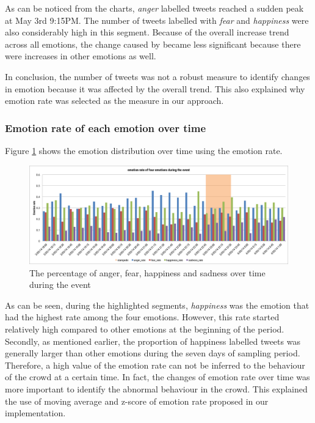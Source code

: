 As can be noticed from the charts, \textit{anger} labelled tweets reached a sudden peak at May 3rd 9:15PM. The number of tweets labelled with \textit{fear} and \textit{happiness} were also considerably high in this segment. Because of the overall increase trend across all emotions, the change caused by  became less significant because there were increases in other emotions as well.

In conclusion, the number of tweets was not a robust measure to identify changes in emotion because it was affected by the overall trend. This also explained why emotion rate was selected as the measure in our approach.

\subsubsection{Emotion rate of each emotion over time}
Figure \ref{fig:emotionRateEvent} shows the emotion distribution over time using the emotion rate. 

\begin{figure}[!htbp] 
\centering
\includegraphics[width=1.0\linewidth]{EmotionRateEvent}
\caption{The percentage of anger, fear, happiness and sadness over time during the event}
\label{fig:emotionRateEvent}
\end{figure}

As can be seen, during the highlighted segments, \textit{happiness} was the emotion that had the highest rate among the four emotions. However, this rate started relatively high compared to other emotions at the beginning of the period. Secondly, as mentioned earlier, the proportion of happiness labelled tweets was generally larger than other emotions during the seven days of sampling period. Therefore, a high value of the emotion rate can not be inferred to the behaviour of the crowd at a certain time. In fact, the changes of emotion rate over time was more important to identify the abnormal behaviour in the crowd. This explained the use of moving average and z-score of emotion rate proposed in our implementation.

